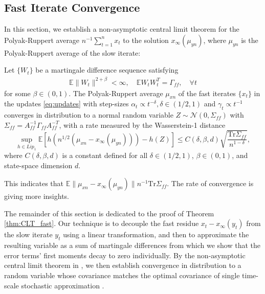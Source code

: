 \subsection{Fast Iterate Convergence}\label{sec:fast}
In this section, we establish a non-asymptotic central limit theorem for the Polyak-Ruppert average $n^{-1} \sum_{t=1}^n x_t$ to the solution $x_\infty (\mu_{yn})$, where $\mu_{yn}$ is the Polyak-Ruppert average of the slow iterate:
\begin{theorem}\label{thm:CLT_fast}
    Let $\{W_t\}$ be a martingale difference sequence satisfying 
    \begin{align*}
        \mathbb{E}\lVert W_t \rVert^{2 + \beta} < \infty, \quad \mathbb{E} W_t W_t^T = \Gamma_{ff} , \quad \forall t
    \end{align*}
    for some $\beta \in (0, 1)$. 
    The Polyak-Ruppert average $\mu_{xn}$ of the fast iterates $\{x_t\}$ in the updates \eqref{eq:updates} with step-sizes $\alpha_t \propto t^{-\delta}, \delta \in (1/2, 1)$ and $\gamma_t \propto t^{-1}$ converges in distribution to a normal random variable $Z \sim \mathcal{N}(0, \Sigma_{ff})$ with $\Sigma_{ff} = A_{ff}^{-1}\Gamma_{ff} A_{ff}^{-T}$, with a rate measured by the Wasserstein-1 distance
    \begin{equation}
        \sup_{h \in Lip_1} \mathbb{E}\left[
            h\left(n^{1/2} \left(\mu_{xn} - x_\infty (\mu_{yn}) \right) \right) - h\left(Z\right)
        \right] \leq 
        C(\delta, \beta, d) \sqrt{\frac{\mathrm{Tr} \Sigma_{ff}}{n^{1 - \delta}}} ,
    \end{equation}
    where $C(\delta, \beta, d)$ is a constant defined for all $\delta \in (1/2, 1)$, $\beta \in (0, 1)$, and state-space dimension $d$.
\end{theorem}
\begin{remark}
    This indicates that $\mathbb{E}\lVert \mu_{xn} - x_\infty (\mu_{yn}) \rVert n^{-1} \mathrm{Tr} \Sigma_{ff}$. 
    The rate of convergence is giving more insights. 
\end{remark}



The remainder of this section is dedicated to the proof of Theorem \ref{thm:CLT_fast}. 
Our technique is to decouple the fast residue $x_t - x_\infty (y_t)$ from the slow iterate $y_t$ using a linear transformation, and then to approximate the resulting variable as a sum of martingale differences from which we show that the error terms' first moments decay to zero individually. 
By the non-asymptotic central limit theorem in \citep{srikant2024CLT}, we then establish convergence in distribution to a random variable whose covariance matches the optimal covariance of single time-scale stochastic approximation \citep{polyakJuditsky}.

